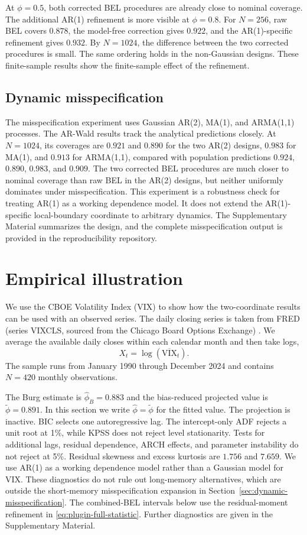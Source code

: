 \documentclass[12pt]{article}
\theoremstyle{remark}
\begin{document}
At $\phi=0.5$, both corrected BEL procedures are already close to nominal coverage. The additional AR(1) refinement is more visible at $\phi=0.8$. For $N=256$, raw BEL covers $0.878$, the model-free correction gives $0.922$, and the AR(1)-specific refinement gives $0.932$. By $N=1024$, the difference between the two corrected procedures is small. The same ordering holds in the non-Gaussian designs. These finite-sample results show the finite-sample effect of the refinement.

\subsection{Dynamic misspecification}
The misspecification experiment uses Gaussian AR(2), MA(1), and ARMA(1,1) processes. The AR-Wald results track the analytical predictions closely. At $N=1024$, its coverages are $0.921$ and $0.890$ for the two AR(2) designs, $0.983$ for MA(1), and $0.913$ for ARMA(1,1), compared with population predictions $0.924$, $0.890$, $0.983$, and $0.909$. The two corrected BEL procedures are much closer to nominal coverage than raw BEL in the AR(2) designs, but neither uniformly dominates under misspecification. This experiment is a robustness check for treating AR(1) as a working dependence model. It does not extend the AR(1)-specific local-boundary coordinate to arbitrary dynamics. The Supplementary Material summarizes the design, and the complete misspecification output is provided in the reproducibility repository.

\section{Empirical illustration}
\label{sec:empirical}

We use the CBOE Volatility Index (VIX) to show how the two-coordinate results can be used with an observed series. The daily closing series is taken from FRED (series VIXCLS, sourced from the Chicago Board Options Exchange) \citep{FRED:VIXCLS}. We average the available daily closes within each calendar month and then take logs,
\[
X_t=\log(\overline{\mathrm{VIX}}_t).
\]
The sample runs from January 1990 through December 2024 and contains $N=420$ monthly observations.

The Burg estimate is $\widehat\phi_B=0.883$ and the bias-reduced projected value is $\widetilde\phi=0.891$. In this section we write $\widehat\phi=\widetilde\phi$ for the fitted value. The projection is inactive. BIC selects one autoregressive lag. The intercept-only ADF rejects a unit root at 1\%, while KPSS does not reject level stationarity. Tests for additional lags, residual dependence, ARCH effects, and parameter instability do not reject at 5\%. Residual skewness and excess kurtosis are $1.756$ and $7.659$. We use AR(1) as a working dependence model rather than a Gaussian model for VIX. These diagnostics do not rule out long-memory alternatives, which are outside the short-memory misspecification expansion in Section~\ref{sec:dynamic-misspecification}. The combined-BEL intervals below use the residual-moment refinement in \eqref{eq:plugin-full-statistic}. Further diagnostics are given in the Supplementary Material.
\end{document}
